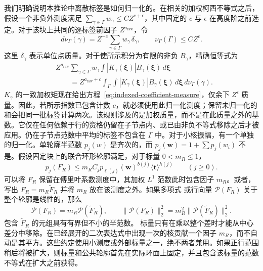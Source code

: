\documentclass[11pt,a4paper]{article}
\numberwithin{equation}{section}
\numberwithin{figure}{section}
\theoremstyle{definition}
\theoremstyle{remark}
\begin{document}
我们明确说明本推论中离散标签是如何归一化的。在相关的加权柯西不等式之后，假设一个非负外测度满足
$\sum_{\gamma\in\Gamma}w_\gamma\le C Z^{c+\epsilon}$，其中固定的 $c$ 与 $\epsilon$ 在高度阶之前选定。对于该块上共同的逐标签前因子 $Z^{a_{\mathrm{raw}}}$，令
\[
 d\nu_\Gamma(\gamma)=Z^{-c}
             \sum_{\gamma\in\Gamma}w_\gamma\,\delta_\gamma,
 \qquad \nu_\Gamma(\Gamma)\le C Z^\epsilon.
\]
这里 $\delta_\gamma$ 表示单位点质量。对于使所示积分为有限的非负 $B_\gamma$，精确恒等式为
\begin{equation}\label{eq:normalized-label-measure}
 \begin{split}
 &Z^{a_{\mathrm{raw}}}\sum_{\gamma\in\Gamma}w_\gamma
              \int |K_\gamma(\boldsymbol\xi)|B_\gamma(\boldsymbol\xi)
                                      \,d\boldsymbol\xi\\
 &\qquad=Z^{a_{\mathrm{raw}}+c}
       \int_\Gamma\int |K_\gamma(\boldsymbol\xi)|B_\gamma(\boldsymbol\xi)
                                      \,d\boldsymbol\xi\,d\nu_\Gamma(\gamma).
 \end{split}
\end{equation}
$K_\gamma$ 的一致加权矩现在给出方程~\eqref{eq:indexed-coefficient-measure}，仅余下 $Z^\epsilon$ 质量。因此，若所示指数已包含计数 $c$，就必须使用此归一化测度；保留未归一化的和会把同一批标签计算两次。该规则涉及的是加权质量，而不是在此质量之外的基数。它仅在任何依赖于行的资格仍留在子节点内、或已由非负不等式移除之后才被应用。仍在子节点范数中平均的标签不包含在 $\Gamma$ 中。对于小核振幅，有一个单独的归一化。单轮廓半范数 $p_j(w)$ 是齐次的，而
$p_j(\boldsymbol w)=1+\sum p_j(w_i)$ 不是。假设固定块上的联合环形轮廓满足，对于标量 $0<m_R\le1$，
\[
 p_j(F_R)\le m_R C_j p_{\ell(j)}(\boldsymbol w)^{b(j)}
                         \langle\boldsymbol t\rangle^{h(j)}
       \qquad(j\ge0).
\]
可以将 $F_R$ 保留在傅里叶系数测度中，其加权
$L^1$ 范数此时包含因子 $m_R$。或者，写出
$F_R=m_R\widetilde F_R$ 并将 $m_R$ 放在该测度之外。如果多项式
或行向量 $\mathcal P(F_R)$ 关于整个轮廓是线性的，那么
\[
 \mathcal P(F_R)=m_R\mathcal P(\widetilde F_R),\qquad
 \|\mathcal P(F_R)\|_2^2=m_R^2\|\mathcal P(\widetilde F_R)\|_2^2.
\]
包含 $\widetilde F_R$ 的元组具有有界但不小的半范数。
标量只有在乘以整个差时才能从中心差分中移除。在已经展开的二次表达式中出现一次的核贡献一个因子 $m_R$，而不自动是其平方。这些约定使用小测度或外部标量之一，绝不两者兼用。如果正行范围稍后将被扩大，则标量和公共轮廓首先在实际环面上固定，并且包含该标量的范数不等式在扩大之前获得。
\end{document}
